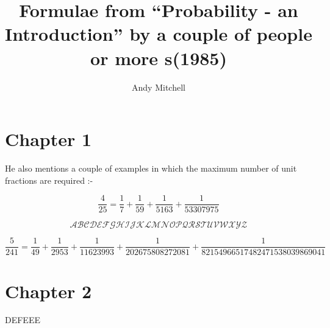 \documentclass[a4paper,10pt]{article}
\author{Andy Mitchell}
\title{Formulae from ``Probability - an Introduction'' by a couple of people or more   s(1985)}
\begin{document}
 
\maketitle 
\begin{flushleft}
\section{Chapter 1}
He also mentions a couple of examples in which the maximum number of unit fractions are required :-

\begin{equation} 
\frac{4}{25} = \frac{1}{7} + \frac{1}{59} +  \frac{1}{5163} +  \frac{1}{53307975}
\end{equation}

\begin{equation} 
\mathscr{ABCDEFGHIJKLMNOPQRSTUVWXYZ}
\end{equation}



\begin{equation*} 
\frac{5}{241} = \frac{1}{49} + \frac{1}{2953} +  \frac{1}{11623993} +  \frac{1}{202675808272081} +  \frac{1}{82154966517482471538039869041} 
\end{equation*}
\section{Chapter 2}
DEFEEE
\end{flushleft}
\end{document}

